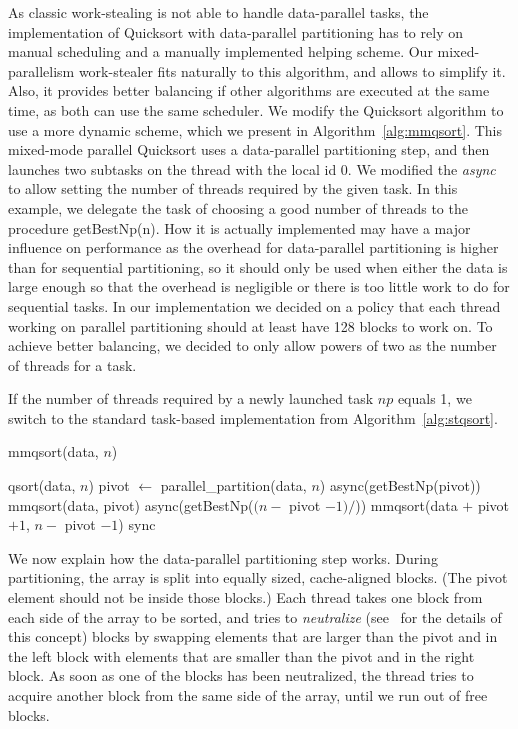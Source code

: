 \documentclass[preprint]{sigplanconf}
\begin{document}
As classic work-stealing is not able to handle data-parallel tasks,
the implementation of Quicksort with data-parallel partitioning has to
rely on manual scheduling and a manually implemented helping
scheme. Our mixed-parallelism work-stealer fits naturally to this
algorithm, and allows to simplify it. Also, it provides better
balancing if other algorithms are executed at the same time, as both
can use the same scheduler. We modify the Quicksort algorithm to use a
more dynamic scheme, which we present in
Algorithm~\ref{alg:mmqsort}. This mixed-mode parallel Quicksort uses a
data-parallel partitioning step, and then launches two subtasks on the
thread with the local id $0$. We modified the \emph{async} to allow
setting the number of threads required by the given task. In this
example, we delegate the task of choosing a good number of threads to
the procedure getBestNp(n). How it is actually implemented may have a
major influence on performance as the overhead for data-parallel
partitioning is higher than for sequential partitioning, so it should
only be used when either the data is large enough so that the overhead
is negligible or there is too little work to do for sequential
tasks. In our implementation we decided on a policy that each thread
working on parallel partitioning should at least have 128 blocks to
work on. To achieve better balancing, we decided to only allow powers
of two as the number of threads for a task.

If the number of threads required by a newly launched task $np$ equals
1, we switch to the standard task-based implementation from
Algorithm~\ref{alg:stqsort}.

\begin{algorithm}
\caption{mmqsort(data, $n$)}\label{alg:mmqsort}
\begin{algorithmic}[1]
	\RETURN qsort(data, $n$)
\ELSE
	\STATE pivot $\gets$ parallel\_partition(data, $n$)
		\STATE async(getBestNp(pivot)) mmqsort(data, pivot)
		\STATE async(getBestNp($(n -$ pivot $- 1)/$)) mmqsort(data $+$ pivot $+ 1$, $n -$ pivot $- 1$)
		\STATE sync
	\ENDIF
\ENDIF
\end{algorithmic}
\end{algorithm}

We now explain how the data-parallel partitioning step works. During
partitioning, the array is split into equally sized, cache-aligned
blocks. (The pivot element should not be inside those blocks.) Each
thread takes one block from each side of the array to be sorted, and
tries to \emph{neutralize} (see~\cite{TsigasZhang03} for the details
of this concept) blocks by swapping elements that are larger than the
pivot and in the left block with elements that are smaller than the
pivot and in the right block. As soon as one of the blocks has been
neutralized, the thread tries to acquire another block from the same
side of the array, until we run out of free blocks.
\end{document}
